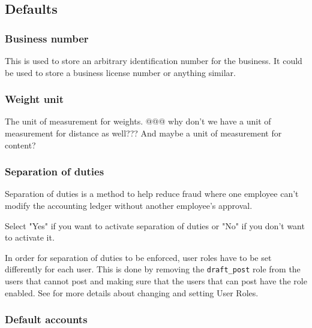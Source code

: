 \subsection{Defaults}
\label{subsec-company-config-defaults}

\subsubsection{Business number}
\label{subsubsec-company-config-defaults-business-number}
   This is used to store an arbitrary identification number for the business.  It
could be used to store a business license number or anything similar.
   
\subsubsection{Weight unit}
\label{subsubsec-company-config-defaults-weight-unit}
   The unit of measurement for weights. @@@ why don't we have a unit of measurement for distance as well??? And maybe a unit of measurement for content?
   
\subsubsection{Separation of duties}
\label{subsubsec-company-config-defaults-separation-of-duties}


Separation of duties  is a method to help reduce fraud where one employee can't modify the
accounting ledger without another employee's approval.

Select "Yes" if you want to activate separation of duties or "No" if you don't
want to activate it.

In order for separation of duties to be enforced, user roles have to be set differently for each user. This is done by removing the \texttt{draft\_post} role from the users that cannot post and making sure that the users that can post have the role enabled.  See  for more details about changing and setting User Roles.

\subsubsection{Default accounts}
\label{subsubsec-company-config-defaults-accounts}

